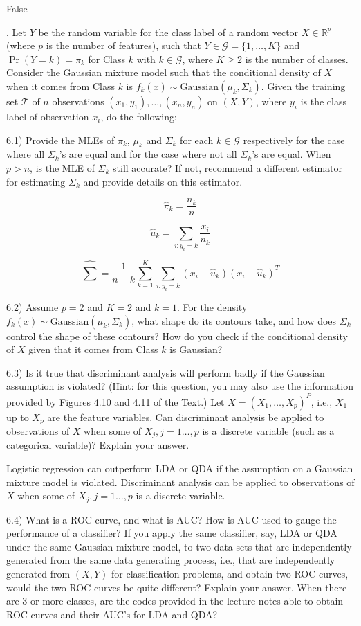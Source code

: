 \documentclass[
  11pt,
]{article}
\begin{document}
False

. Let \(Y\) be the random variable for the class label of a random
vector \(X \in \mathbb{R}^p\) (where \(p\) is the number of features),
such that \(Y \in \mathcal{G}=\{1,\ldots, K\}\) and \(\Pr(Y=k)=\pi_k\)
for Class \(k\) with \(k \in \mathcal{G}\), where \(K \ge 2\) is the
number of classes. Consider the Gaussian mixture model such that the
conditional density of \(X\) when it comes from Class \(k\) is
\(f_k(x) \sim \text{Gaussian}(\mu_k,\Sigma_k)\). Given the training set
\(\mathcal{T}\) of \(n\) observations
\((x_{1},y_{1}),\ldots,(x_{n},y_{n})\) on \((X,Y)\), where \(y_i\) is
the class label of observation \(x_i\), do the following:

6.1) Provide the MLEs of \(\pi_k\), \(\mu_k\) and \(\Sigma_k\) for each
\(k \in \mathcal{G}\) respectively for the case where all \(\Sigma_k\)'s
are equal and for the case where not all \(\Sigma_k\)'s are equal. When
\(p >n\), is the MLE of \(\Sigma_k\) still accurate? If not, recommend a
different estimator for estimating \(\Sigma_k\) and provide details on
this estimator.

\[\hat\pi_k = \frac{n_k}{n}\]

\[\hat{u}_k = \sum_{i:y_i=k}\frac{x_i}{n_k}\]

\[\hat\sum = \frac{1}{n-k}\sum_{k = 1}^{K}\sum_{i:y_i=k}(x_i-\hat{u}_k)(x_i-\hat{u}_k)^T\]

6.2) Assume \(p=2\) and \(K=2\) and \(k=1\). For the density
\(f_k(x) \sim \text{Gaussian}(\mu_k,\Sigma_k)\), what shape do its
contours take, and how does \(\Sigma_k\) control the shape of these
contours? How do you check if the conditional density of \(X\) given
that it comes from Class \(k\) is Gaussian?

6.3) Is it true that discriminant analysis will perform badly if the
Gaussian assumption is violated? (Hint: for this question, you may also
use the information provided by Figures 4.10 and 4.11 of the Text.) Let
\(X=(X_1,\ldots,X_p)^P\), i.e., \(X_1\) up to \(X_p\) are the feature
variables. Can discriminant analysis be applied to observations of \(X\)
when some of \(X_j,j=1\ldots,p\) is a discrete variable (such as a
categorical variable)? Explain your answer.

Logistic regression can outperform LDA or QDA if the assumption on a
Gaussian mixture model is violated. Discriminant analysis can be applied
to observations of \(X\) when some of \(X_j,j=1\ldots,p\) is a discrete
variable.

6.4) What is a ROC curve, and what is AUC? How is AUC used to gauge the
performance of a classifier? If you apply the same classifier, say, LDA
or QDA under the same Gaussian mixture model, to two data sets that are
independently generated from the same data generating process, i.e.,
that are independently generated from \((X,Y)\) for classification
problems, and obtain two ROC curves, would the two ROC curves be quite
different? Explain your answer. When there are 3 or more classes, are
the codes provided in the lecture notes able to obtain ROC curves and
their AUC's for LDA and QDA?
\end{document}
